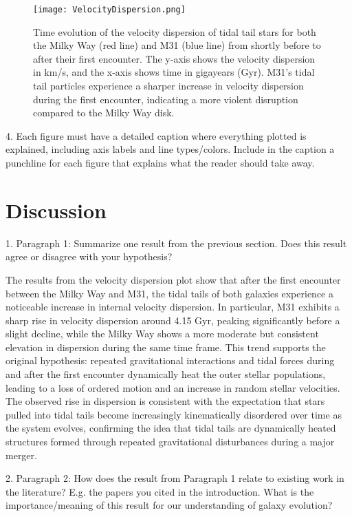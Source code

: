 \documentclass[fleqn,usenatbib]{mnras}
\begin{document}
\begin{figure}
    \centering
    \texttt{[image: VelocityDispersion.png]}
    \caption{Time evolution of the velocity dispersion of tidal tail stars for both the Milky Way (red line) and M31 (blue line) from shortly before to after their first encounter. The y-axis shows the velocity dispersion in km/s, and the x-axis shows time in gigayears (Gyr). M31's tidal tail particles experience a sharper increase in velocity dispersion during the first encounter, indicating a more violent disruption compared to the Milky Way disk.}
    \label{fig:enter-label}
\end{figure}

4. Each figure must have a detailed caption where everything plotted is explained, including axis labels and line types/colors. Include in the caption a punchline for each figure that explains what the reader should take away.



\section{Discussion}

1. Paragraph 1: Summarize one result from the previous section. Does this result agree or disagree with your hypothesis?

The results from the velocity dispersion plot show that after the first encounter between the Milky Way and M31, the tidal tails of both galaxies experience a noticeable increase in internal velocity dispersion. In particular, M31 exhibits a sharp rise in velocity dispersion around 4.15 Gyr, peaking significantly before a slight decline, while the Milky Way shows a more moderate but consistent elevation in dispersion during the same time frame. This trend supports the original hypothesis: repeated gravitational interactions and tidal forces during and after the first encounter dynamically heat the outer stellar populations, leading to a loss of ordered motion and an increase in random stellar velocities. The observed rise in dispersion is consistent with the expectation that stars pulled into tidal tails become increasingly kinematically disordered over time as the system evolves, confirming the idea that tidal tails are dynamically heated structures formed through repeated gravitational disturbances during a major merger.

2. Paragraph 2: How does the result from Paragraph 1 relate to existing work in the literature? E.g. the papers you cited in the introduction. What is the importance/meaning of this result for our understanding of galaxy evolution?
\end{document}
